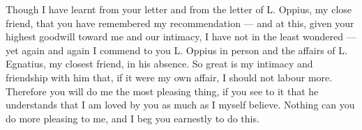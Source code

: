 

 Though I have learnt from your letter and from the letter of L. Oppius, my close friend, that you have remembered my recommendation --- and at this, given your highest goodwill toward me and our intimacy, I have not in the least wondered --- yet again and again I commend to you L. Oppius in person and the affairs of L. Egnatius, my closest friend, in his absence. So great is my intimacy and friendship with him that, if it were my own affair, I should not labour more. Therefore you will do me the most pleasing thing, if you see to it that he understands that I am loved by you as much as I myself believe. Nothing can you do more pleasing to me, and I beg you earnestly to do this.
